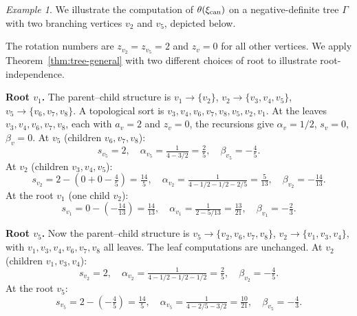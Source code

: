 \documentclass[11pt]{amsart}
\theoremstyle{plain}
\theoremstyle{definition}
\theoremstyle{remark}
\newtheorem{example}[theorem]{Example}
\begin{document}
\begin{example}\label{ex:two-branching}
We illustrate the computation of $\theta(\xi_{\rm can})$ on a
negative-definite tree $\Gamma$ with two branching vertices $v_2$
and $v_5$, depicted below.

\begin{center}
\end{center}

The rotation numbers are $z_{v_2}=z_{v_5}=2$ and $z_v=0$ for all
other vertices. We apply Theorem~\ref{thm:tree-general} with two
different choices of root to illustrate root-independence.

\medskip
\noindent\textbf{Root $v_1$.} The parent--child structure is
$v_1\to\{v_2\}$, $v_2\to\{v_3,v_4,v_5\}$, $v_5\to\{v_6,v_7,v_8\}$. A
topological sort is $v_3,v_4,v_6,v_7,v_8,v_5,v_2,v_1$. At the leaves
$v_3,v_4,v_6,v_7,v_8$, each with $a_v=2$ and $z_v=0$, the recursions
give $\alpha_v=1/2$, $s_v=0$, $\beta_v=0$. At $v_5$ (children
$v_6,v_7,v_8$):
\[
s_{v_5}=2,\quad
\alpha_{v_5}=\tfrac{1}{4-3/2}=\tfrac{2}{5},\quad
\beta_{v_5}=-\tfrac{4}{5}.
\]
At $v_2$ (children $v_3,v_4,v_5$):
\[
s_{v_2}=2-(0+0-\tfrac{4}{5})=\tfrac{14}{5},\quad
\alpha_{v_2}=\tfrac{1}{4-1/2-1/2-2/5}=\tfrac{5}{13},\quad
\beta_{v_2}=-\tfrac{14}{13}.
\]
At the root $v_1$ (one child $v_2$):
\[
s_{v_1}=0-(-\tfrac{14}{13})=\tfrac{14}{13},\quad
\alpha_{v_1}=\tfrac{1}{2-5/13}=\tfrac{13}{21},\quad
\beta_{v_1}=-\tfrac{2}{3}.
\]

\medskip
\noindent\textbf{Root $v_5$.} Now the parent--child structure is
$v_5\to\{v_2,v_6,v_7,v_8\}$, $v_2\to\{v_1,v_3,v_4\}$, with
$v_1,v_3,v_4,v_6,v_7,v_8$ all leaves. The leaf computations are
unchanged. At $v_2$ (children $v_1,v_3,v_4$):
\[
s_{v_2}=2,\quad
\alpha_{v_2}=\tfrac{1}{4-1/2-1/2-1/2}=\tfrac{2}{5},\quad
\beta_{v_2}=-\tfrac{4}{5}.
\]
At the root $v_5$:
\[
s_{v_5}=2-(-\tfrac{4}{5})=\tfrac{14}{5},\quad
\alpha_{v_5}=\tfrac{1}{4-2/5-3/2}=\tfrac{10}{21},\quad
\beta_{v_5}=-\tfrac{4}{3}.
\]


\end{example}
\end{document}
